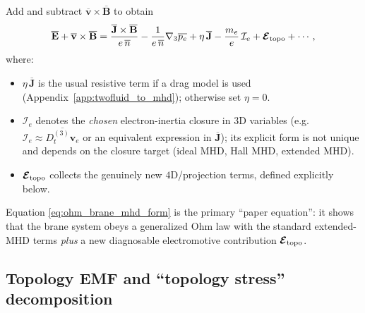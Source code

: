 \documentclass[11pt]{article}
\newcommand{\gradthree}{\nabla_3}
\begin{document}
Add and subtract \(\overline{\mathbf{v}}\times\overline{\mathbf{B}}\) to obtain
\begin{equation}
\overline{\mathbf{E}}+\overline{\mathbf{v}}\times\overline{\mathbf{B}}
=
\frac{\overline{\mathbf{J}}\times\overline{\mathbf{B}}}{e\,\overline{n}}
-\frac{1}{e\,\overline{n}}\gradthree\overline{p_e}
+\eta\,\overline{\mathbf{J}}
-\frac{m_e}{e}\,\mathcal{I}_e
+\boldsymbol{\mathcal{E}}_{\rm topo}
+\cdots,
\label{eq:ohm_brane_mhd_form}
\end{equation}
where:
\begin{itemize}[leftmargin=1.7em]
\item \(\eta\,\overline{\mathbf{J}}\) is the usual resistive term if a drag model is used
(Appendix~\ref{app:twofluid_to_mhd}); otherwise set \(\eta=0\).
\item \(\mathcal{I}_e\) denotes the \emph{chosen} electron-inertia closure in \(3\)D variables
(e.g.\ \(\mathcal{I}_e\approx \overline{D_t^{(3)}\mathbf{v}_e}\) or an equivalent expression in
\(\overline{\mathbf{J}}\)); its explicit form is not unique and depends on the closure target
(ideal MHD, Hall MHD, extended MHD).
\item \(\boldsymbol{\mathcal{E}}_{\rm topo}\) collects the genuinely new \(4\)D/projection terms,
defined explicitly below.
\end{itemize}

Equation \eqref{eq:ohm_brane_mhd_form} is the primary ``paper equation'': it shows that the brane
system obeys a generalized Ohm law with the standard extended-MHD terms \emph{plus} a new
diagnosable electromotive contribution \(\boldsymbol{\mathcal{E}}_{\rm topo}\).

\subsection{Topology EMF and ``topology stress'' decomposition}
\label{subsec:topology_emf_def}
\end{document}
